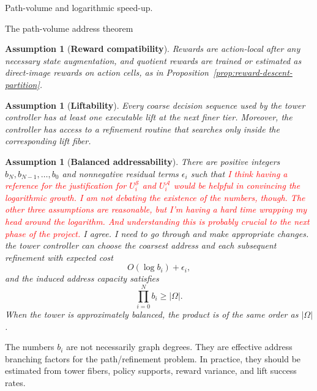 \documentclass[11pt]{article}
\newtheorem{assumption}[subsubsection]{Assumption}
\begin{document}
\begin{section}{Path-volume and logarithmic speed-up.}
\begin{subsection}{The path-volume address theorem}
\begin{assumption}[{\bf Reward compatibility}]\label{ass:path-volume-reward-compat}
\normalfont
Rewards are action-local after any necessary state augmentation, and quotient rewards are trained or estimated as direct-image rewards on action cells, as in Proposition~\ref{prop:reward-descent-partition}.
\end{assumption}

\begin{assumption}[{\bf Liftability}]\label{ass:path-volume-liftability}
\normalfont
Every coarse decision sequence used by the tower controller has at least one executable lift at the next finer tier. Moreover, the controller has access to a refinement routine that searches only inside the corresponding lift fiber.
\end{assumption}

\begin{assumption}[{\bf Balanced addressability}]\label{ass:path-volume-balanced}
\normalfont
There are positive integers
$
b_N,b_{N-1},\ldots,b_0
$
and nonnegative residual terms $\epsilon_i$ such that \textcolor{red}{I think having a reference for the justification for $U^{\mathcal{S}}_i$ and $U^{\mathcal{A}}_i$ would be helpful in convincing the logarithmic growth. I am not debating the existence of the numbers, though. The other three assumptions are reasonable, but I'm having a hard time wrapping my head around the logarithm. And understanding this is probably crucial to the next phase of the project.} {\color{blue} I agree. I need to go through and make appropriate changes.} the tower controller can choose the coarsest address and each subsequent refinement with expected cost
$$
O(\log b_i)+\epsilon_i,
$$
and the induced address capacity satisfies
$$
\prod_{i=0}^{N}b_i\ge |\Omega|.
$$
When the tower is approximately balanced, the product is of the same order as $|\Omega|$.
\end{assumption}

The numbers $b_i$ are not necessarily graph degrees. They are effective address branching factors for the path/refinement problem. In practice, they should be estimated from tower fibers, policy supports, reward variance, and lift success rates.


\end{subsection}
\end{section}
\end{document}
